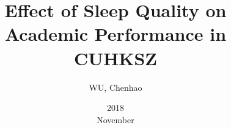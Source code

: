 \documentclass[12pt]{article}
\begin{document}
	\title{Effect of Sleep Quality on Academic Performance in CUHKSZ}
	\date{2018 \\November}
	\author{WU, Chenhao}
\end{document}

